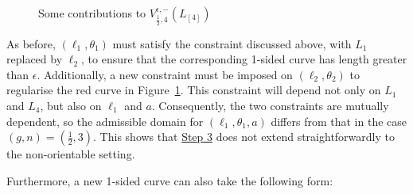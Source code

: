 \documentclass[12pt]{amsart}
\theoremstyle{plain}
\theoremstyle{definition}
\theoremstyle{remark}
\numberwithin{equation}{section}
\begin{document}
\begin{figure}[htbp]
\caption{Some contributions to $V_{\frac12,4}^{\epsilon,-}(L_{[4]})$}\label{fig:1/2,4-1}
\end{figure}

\noindent As before, $(\ell_1,\theta_1)$ must satisfy the constraint discussed above, with $L_1$ replaced by $\ell_2$, to ensure that the corresponding 1-sided curve has length greater than $\epsilon$. Additionally, a new constraint must be imposed on $(\ell_2,\theta_2)$ to regularise the red curve in Figure~\ref{fig:1/2,4-1}. This constraint will depend not only on $L_1$ and $L_4$, but also on $\ell_1$ and $a$. Consequently, the two constraints are mutually dependent, so the admissible domain for $(\ell_1,\theta_1,a)$ differs from that in the case $(g,n)=(\frac12,3)$. This shows that \hyperref[item:Step3]{Step 3} does not extend straightforwardly to the non-orientable setting.

Furthermore, a new 1-sided curve can also take the following form:
\end{document}
